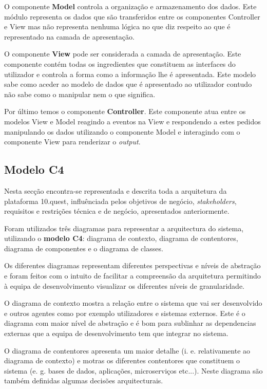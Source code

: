 O componente \textbf{Model} controla a organização e armazenamento dos dados. Este módulo representa os dados que são transferidos entre os componentes Controller e View mas não representa nenhuma lógica no que diz respeito ao que é representado na camada de apresentação.

O componente \textbf{View} pode ser considerada a camada de apresentação. Este componente contém todas os ingredientes que constituem as interfaces do utilizador e controla a forma como a informação lhe é apresentada. Este modelo sabe como aceder ao modelo de dados que é apresentado ao utilizador contudo não sabe como o manipular nem o que significa.

Por último temos o componente \textbf{Controller}.  Este componente atua entre os modelos View e Model reagindo a eventos na View e respondendo a estes pedidos manipulando os dados utilizando o componente Model e interagindo com o componente View para renderizar o \textit{output}.


\subsection{Modelo C4}

Nesta secção encontra-se representada e descrita toda a arquitetura da plataforma 10.quest,  influênciada pelos objetivos de negócio, \textit{stakeholders}, requisitos e restrições técnica e de negócio, apresentados anteriormente.

Foram utilizados três diagramas para representar a arquitectura do sistema, utilizando o \textbf{modelo C4}\cite{c4}: diagrama de contexto, diagrama de contentores, diagrama de componentes e o diagrama de classes.

Os diferentes diagramas representam diferentes perspectivas e níveis de abstração e foram feitos com o intuito de facilitar a compreensão da arquitetura permitindo à equipa de desenvolvimento visualizar os diferentes níveis de granularidade. 

O diagrama de contexto mostra a relação entre o sistema que vai ser desenvolvido e outros agentes como por exemplo utilizadores e sistemas externos.  Este é o diagrama com maior nível de abstração e é bom para sublinhar as dependencias externas que a equipa de desenvolvimento tem que integrar no sistema. 

O diagrama de contentores apresenta um maior detalhe (i. e. relativamente ao diagrama de contexto) e motras os diferentes contentores que constituem o sistema (e. g. bases de dados, aplicações, microserviços etc...). Neste diagrama são também definidas algumas decisões arquitecturais. 

